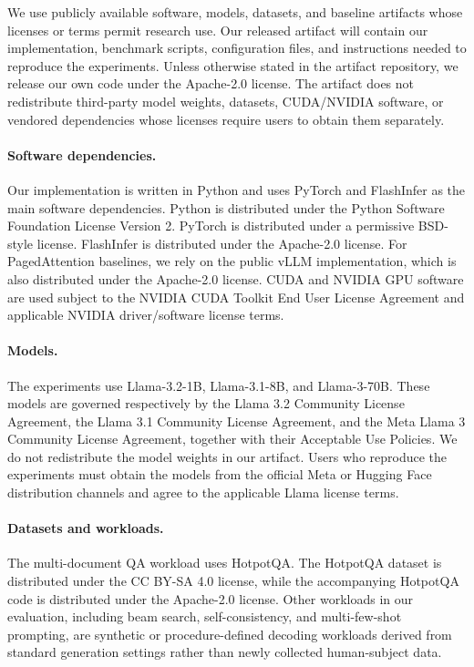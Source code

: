 \documentclass[11pt]{article}
\begin{document}
We use publicly available software, models, datasets, and baseline artifacts
whose licenses or terms permit research use. Our released artifact will contain
our implementation, benchmark scripts, configuration files, and instructions
needed to reproduce the experiments. Unless otherwise stated in the artifact
repository, we release our own code under the Apache-2.0 license. The artifact
does not redistribute third-party model weights, datasets, CUDA/NVIDIA software,
or vendored dependencies whose licenses require users to obtain them separately.

\paragraph{Software dependencies.}
Our implementation is written in Python and uses PyTorch and FlashInfer as the
main software dependencies. Python is distributed under the Python Software
Foundation License Version 2. PyTorch is distributed under a permissive
BSD-style license. FlashInfer is distributed under the Apache-2.0 license. For
PagedAttention baselines, we rely on the public vLLM implementation, which is
also distributed under the Apache-2.0 license. CUDA and NVIDIA GPU software are
used subject to the NVIDIA CUDA Toolkit End User License Agreement and
applicable NVIDIA driver/software license terms.

\paragraph{Models.}
The experiments use Llama-3.2-1B, Llama-3.1-8B, and Llama-3-70B. These models
are governed respectively by the Llama 3.2 Community License Agreement, the
Llama 3.1 Community License Agreement, and the Meta Llama 3 Community License
Agreement, together with their Acceptable Use Policies. We do not redistribute
the model weights in our artifact. Users who reproduce the experiments must
obtain the models from the official Meta or Hugging Face distribution channels
and agree to the applicable Llama license terms.

\paragraph{Datasets and workloads.}
The multi-document QA workload uses HotpotQA. The HotpotQA dataset is
distributed under the CC BY-SA 4.0 license, while the accompanying HotpotQA code
is distributed under the Apache-2.0 license. Other workloads in our evaluation,
including beam search, self-consistency, and multi-few-shot prompting, are
synthetic or procedure-defined decoding workloads derived from standard
generation settings rather than newly collected human-subject data.
\end{document}
